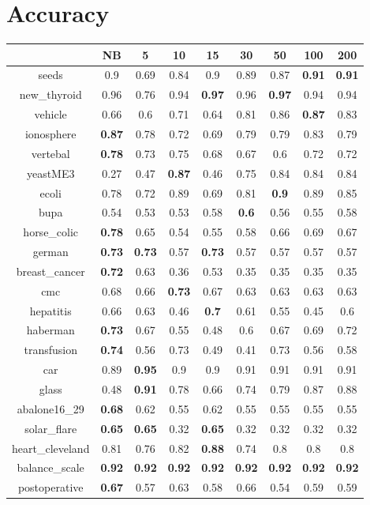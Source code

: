 \documentclass{article}%
\begin{document}
%
\normalsize%
\section*{Accuracy}%
\begin{tabular}{c|cccccccc}%
&NB&5&10&15&30&50&100&200\\%
\hline%
seeds&0.9&0.69&0.84&0.9&0.89&0.87&\textbf{0.91}&\textbf{0.91}\\%
new\_thyroid&0.96&0.76&0.94&\textbf{0.97}&0.96&\textbf{0.97}&0.94&0.94\\%
vehicle&0.66&0.6&0.71&0.64&0.81&0.86&\textbf{0.87}&0.83\\%
ionosphere&\textbf{0.87}&0.78&0.72&0.69&0.79&0.79&0.83&0.79\\%
vertebal&\textbf{0.78}&0.73&0.75&0.68&0.67&0.6&0.72&0.72\\%
yeastME3&0.27&0.47&\textbf{0.87}&0.46&0.75&0.84&0.84&0.84\\%
ecoli&0.78&0.72&0.89&0.69&0.81&\textbf{0.9}&0.89&0.85\\%
bupa&0.54&0.53&0.53&0.58&\textbf{0.6}&0.56&0.55&0.58\\%
horse\_colic&\textbf{0.78}&0.65&0.54&0.55&0.58&0.66&0.69&0.67\\%
german&\textbf{0.73}&\textbf{0.73}&0.57&\textbf{0.73}&0.57&0.57&0.57&0.57\\%
breast\_cancer&\textbf{0.72}&0.63&0.36&0.53&0.35&0.35&0.35&0.35\\%
cmc&0.68&0.66&\textbf{0.73}&0.67&0.63&0.63&0.63&0.63\\%
hepatitis&0.66&0.63&0.46&\textbf{0.7}&0.61&0.55&0.45&0.6\\%
haberman&\textbf{0.73}&0.67&0.55&0.48&0.6&0.67&0.69&0.72\\%
transfusion&\textbf{0.74}&0.56&0.73&0.49&0.41&0.73&0.56&0.58\\%
car&0.89&\textbf{0.95}&0.9&0.9&0.91&0.91&0.91&0.91\\%
glass&0.48&\textbf{0.91}&0.78&0.66&0.74&0.79&0.87&0.88\\%
abalone16\_29&\textbf{0.68}&0.62&0.55&0.62&0.55&0.55&0.55&0.55\\%
solar\_flare&\textbf{0.65}&\textbf{0.65}&0.32&\textbf{0.65}&0.32&0.32&0.32&0.32\\%
heart\_cleveland&0.81&0.76&0.82&\textbf{0.88}&0.74&0.8&0.8&0.8\\%
balance\_scale&\textbf{0.92}&\textbf{0.92}&\textbf{0.92}&\textbf{0.92}&\textbf{0.92}&\textbf{0.92}&\textbf{0.92}&\textbf{0.92}\\%
postoperative&\textbf{0.67}&0.57&0.63&0.58&0.66&0.54&0.59&0.59\\%
\end{tabular}
\end{document}
